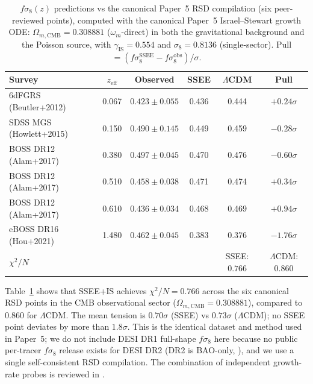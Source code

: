 \documentclass[12pt,a4paper]{article}
\begin{document}
\begin{table}[ht]
\centering
\caption{$f\sigma_8(z)$ predictions vs the canonical Paper~5 RSD compilation
  (six peer-reviewed points), computed with the canonical Paper~5
  Israel--Stewart growth ODE: $\Omega_{m,\mathrm{CMB}}=0.308881$
  ($\omega_m$-direct) in both the gravitational background and the Poisson
  source, with $\gamma_\mathrm{IS}=0.554$ and $\sigma_8=0.8136$ (single-sector).
  Pull $=(f\sigma_8^\mathrm{SSEE}-f\sigma_8^\mathrm{obs})/\sigma$.}
\label{tab:fsig8}
\begin{tabular}{lccccc}
\hline
Survey & $z_\mathrm{eff}$ & Observed & SSEE & $\Lambda$CDM & Pull \\
\hline
6dFGRS (Beutler+2012)   & 0.067 & $0.423\pm0.055$ & 0.436 & 0.444 & $+0.24\sigma$ \\
SDSS MGS (Howlett+2015) & 0.150 & $0.490\pm0.145$ & 0.449 & 0.459 & $-0.28\sigma$ \\
BOSS DR12 (Alam+2017)   & 0.380 & $0.497\pm0.045$ & 0.470 & 0.476 & $-0.60\sigma$ \\
BOSS DR12 (Alam+2017)   & 0.510 & $0.458\pm0.038$ & 0.471 & 0.474 & $+0.34\sigma$ \\
BOSS DR12 (Alam+2017)   & 0.610 & $0.436\pm0.034$ & 0.468 & 0.469 & $+0.94\sigma$ \\
eBOSS DR16 (Hou+2021)   & 1.480 & $0.462\pm0.045$ & 0.383 & 0.376 & $-1.76\sigma$ \\
\hline
\multicolumn{4}{l}{$\chi^2/N$} & SSEE: $0.766$ & $\Lambda$CDM: $0.860$ \\
\hline
\end{tabular}
\end{table}

Table~\ref{tab:fsig8} shows that SSEE+IS achieves $\chi^2/N=0.766$ across the
six canonical RSD points in the CMB observational sector
($\Omega_{m,\mathrm{CMB}}=0.308881$), compared to $0.860$ for $\Lambda$CDM. The
mean tension is $0.70\sigma$ (SSEE) vs $0.73\sigma$ ($\Lambda$CDM); no SSEE point
deviates by more than $1.8\sigma$. This is the identical dataset and method used
in Paper~5; we do not include DESI DR1 full-shape $f\sigma_8$ here because no
public per-tracer $f\sigma_8$ release exists for DESI DR2 (DR2 is BAO-only,
\citealp{DESI_DR2}), and we use a single self-consistent RSD compilation.
The combination of independent growth-rate probes is reviewed in \citet{Moresco2022}.
\end{document}

